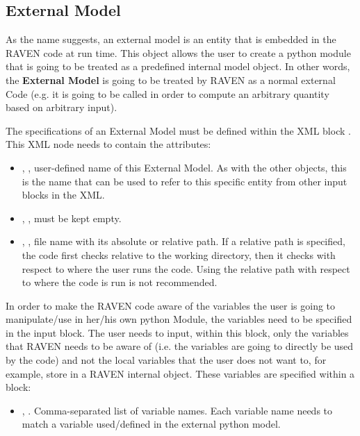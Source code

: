 \subsection{External Model}
\label{subsec:models_externalModel}
As the name suggests, an external model is an entity that is embedded in the
RAVEN code at run time.
%
This object allows the user to create a python module that is going to be
treated as a predefined internal model object.
%
In other words, the \textbf{External Model} is going to be treated by RAVEN as a
normal external Code (e.g. it is going to be called in order to compute an
arbitrary quantity based on arbitrary input).
%

The specifications of an External Model must be defined within the XML block
.
%
This XML node needs to contain the attributes:

\vspace{-5mm}
\begin{itemize}
  \itemsep0em
  \item {}, , user-defined name
  of this External Model.
  \nb As with the other objects, this is the name that can be used to refer to
  this specific entity from other input blocks in the XML.
  \item {}, , must be kept
  empty.
  \item {}, , file name
  with its absolute or relative path.
  \nb If a relative path is specified, the code first checks relative
  to the working directory, then it checks with respect to where the
  user runs the code.  Using the relative path with respect to where the
  code is run is not recommended.
\end{itemize}
\vspace{-5mm}

In order to make the RAVEN code aware of the variables the user is going to
manipulate/use in her/his own python Module, the variables need to be specified
in the  input block.
%
The user needs to input, within this block, only the variables that RAVEN needs
to be aware of (i.e. the variables are going to directly be used by the code)
and not the local variables that the user does not want to, for example, store
in a RAVEN internal object.
%
These variables are specified within a  block:
\begin{itemize}
  \item {}, .
  Comma-separated list of variable names.
  Each variable name needs to match a variable used/defined in the external python
  model.
\end{itemize}

